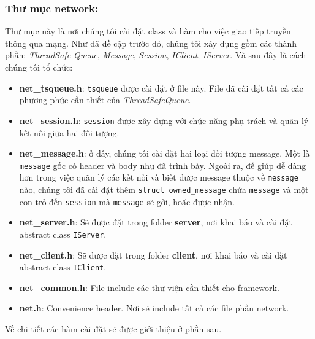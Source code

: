 \subsubsection{Thư mục network: }
Thư mục này là nơi chúng tôi cài đặt class và hàm cho việc giao tiếp truyền thông qua mạng. Như đã đề cập trước đó, chúng tôi xây dụng gồm các thành phần: \textit{ThreadSafe Queue}, \textit{Message}, \textit{Session}, \textit{IClient}, \textit{IServer}. Và sau đây là cách chúng tôi tổ chức: 
\begin{itemize}
	\item \textbf{net\_tsqueue.h}: \verb|tsqueue| được cài đặt ở file này. File đã cài đặt tất cả các phương phức cần thiết của \textit{ThreadSafeQueue}.
	 \item \textbf{net\_session.h}: \verb|session| được xây dựng với chức năng phụ trách và quãn lý kết nối giữa hai đối tượng.
	 \item \textbf{net\_message.h}: ở đây, chúng tôi cài đặt hai loại đối tượng message. Một là \verb|message| gốc có header và body như đã trình bày. Ngoài ra, để giúp dễ dàng hơn trong việc quãn lý các kết nối và biết được message thuộc về \verb|message| nào, chúng tôi đã cài đặt thêm \verb|struct owned_message| chứa \verb|message| và một con trỏ đến \verb|session| mà \verb|message| sẽ gởi, hoặc được nhận. 
	 \item \textbf{net\_server.h}: Sẽ được đặt trong folder \textbf{server}, nơi khai báo và cài đặt abstract class \verb|IServer|.
	 \item \textbf{net\_client.h}: Sẽ được đặt trong folder \textbf{client}, nơi khai báo và cài đặt abstract class \verb|IClient|. 
	 \item \textbf{net\_common.h}: File include các thư viện cần thiết cho framework.
	 \item \textbf{net.h}: Convenience header. Nơi sẽ include tất cả các file phần network. 
\end{itemize}

Về chi tiết các hàm cài đặt sẽ được giới thiệu ở phần sau.
